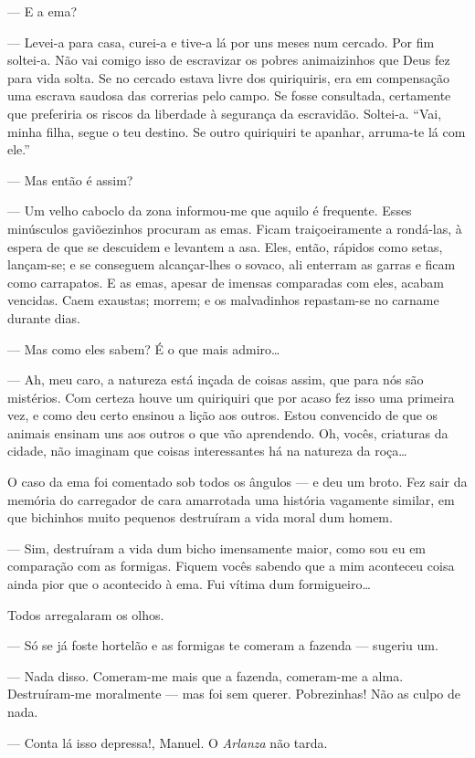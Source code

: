 --- E a ema?

--- Levei-a para casa, curei-a e tive-a lá por uns meses num cercado.
Por fim soltei-a. Não vai comigo isso de escravizar os pobres
animaizinhos que Deus fez para vida solta. Se no cercado estava livre
dos quiriquiris, era em compensação uma escrava saudosa das correrias
pelo campo. Se fosse consultada, certamente que preferiria os riscos da
liberdade à segurança da escravidão. Soltei-a. ``Vai, minha filha, segue
o teu destino. Se outro quiriquiri te apanhar, arruma-te lá com ele.''

--- Mas então é assim?

--- Um velho caboclo da zona informou-me que aquilo é frequente. Esses
minúsculos gaviõezinhos procuram as emas. Ficam traiçoeiramente a
rondá-las, à espera de que se descuidem e levantem a asa. Eles, então,
rápidos como setas, lançam-se; e se conseguem alcançar-lhes o sovaco,
ali enterram as garras e ficam como carrapatos. E as emas, apesar de
imensas comparadas com eles, acabam vencidas. Caem exaustas; morrem; e
os malvadinhos repastam-se no carname durante dias.

--- Mas como eles sabem? É o que mais admiro\ldots{}

--- Ah, meu caro, a natureza está inçada de coisas assim, que para nós
são mistérios. Com certeza houve um quiriquiri que por acaso fez isso
uma primeira vez, e como deu certo ensinou a lição aos outros. Estou
convencido de que os animais ensinam uns aos outros o que vão
aprendendo. Oh, vocês, criaturas da cidade, não imaginam que coisas
interessantes há na natureza da roça\ldots{}

O caso da ema foi comentado sob todos os ângulos --- e deu um broto. Fez
sair da memória do carregador de cara amarrotada uma história vagamente
similar, em que bichinhos muito pequenos destruíram a vida moral dum
homem.

--- Sim, destruíram a vida dum bicho imensamente maior, como sou eu em
comparação com as formigas. Fiquem vocês sabendo que a mim aconteceu
coisa ainda pior que o acontecido à ema. Fui vítima dum formigueiro\ldots{}

Todos arregalaram os olhos.

--- Só se já foste hortelão e as formigas te comeram a fazenda ---
sugeriu um.

--- Nada disso. Comeram-me mais que a fazenda, comeram-me a alma.
Destruíram-me moralmente --- mas foi sem querer. Pobrezinhas! Não as
culpo de nada.

--- Conta lá isso depressa!, Manuel. O \emph{Arlanza} não tarda.

